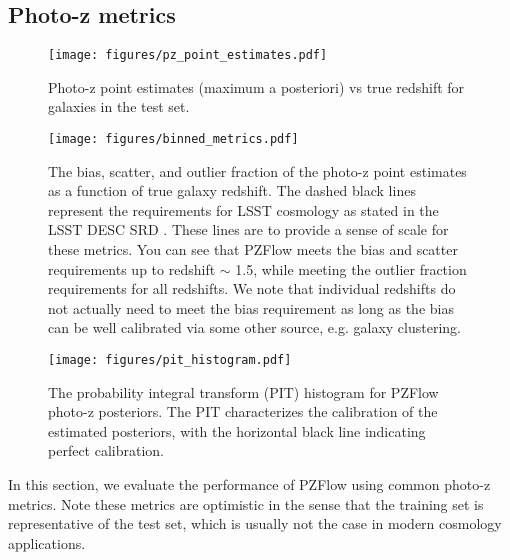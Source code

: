\documentclass[twocolumn,twocolappendix]{aastex631}
\begin{document}
\subsection{Photo-z metrics}

\begin{figure}[t]
    \begin{centering}
        \texttt{[image: figures/pz\_point\_estimates.pdf]}
        \caption{
            Photo-z point estimates (maximum a posteriori) vs true redshift for galaxies in the test set.
        }
        \label{fig:point-estimates}
    \end{centering}
\end{figure}

\begin{figure*}[t]
    \begin{centering}
        \texttt{[image: figures/binned\_metrics.pdf]}
        \caption{
            The bias, scatter, and outlier fraction of the photo-z point estimates as a function of true galaxy redshift.
            The dashed black lines represent the requirements for LSST cosmology as stated in the LSST DESC SRD \citep{descSRD}.
            These lines are to provide a sense of scale for these metrics.
            You can see that PZFlow meets the bias and scatter requirements up to redshift $\sim$ 1.5, while meeting the outlier fraction requirements for all redshifts.
            We note that individual redshifts do not actually need to meet the bias requirement as long as the bias can be well calibrated via some other source, e.g. galaxy clustering.
        }
        \label{fig:binned-metrics}
    \end{centering}
\end{figure*}

\begin{figure}[t]
    \begin{centering}
        \texttt{[image: figures/pit\_histogram.pdf]}
        \caption{
            The probability integral transform (PIT) histogram for PZFlow photo-z posteriors.
            The PIT characterizes the calibration of the estimated posteriors, with the horizontal black line indicating perfect calibration.
        }
        \label{fig:pit-histogram}
    \end{centering}
\end{figure}

In this section, we evaluate the performance of PZFlow using common photo-z metrics.
Note these metrics are optimistic in the sense that the training set is representative of the test set, which is usually not the case in modern cosmology applications.
\end{document}
